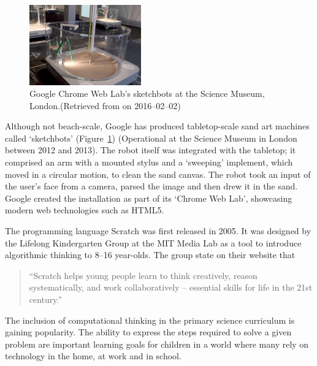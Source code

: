         \begin{figure}
          \begin{center}
            \includegraphics[width=0.43\textwidth]{Files/sketchbots}
          \end{center}
          \caption{Google Chrome Web Lab's sketchbots at the Science Museum, London.{\small (Retrieved from  on 2016--02--02)}}
          \label{fig: sketchbots}
        \end{figure}
        Although not beach-scale, Google has produced tabletop-scale sand art machines called `sketchbots' (Figure~\ref{fig: sketchbots}) (Operational at the Science Museum in London between 2012 and 2013).\cite{Warman2012} The robot itself was integrated with the tabletop; it comprised an arm with a mounted stylus and a `sweeping' implement, which moved in a circular motion, to clean the sand canvas. The robot took an input of the user's face from a camera, parsed the image and then drew it in the sand. Google  created the installation as part of its `Chrome Web Lab', showcasing modern web technologies such as HTML5.

\label{education review}
    The programming language Scratch was first released in 2005. It was designed by the Lifelong Kindergarten Group at the MIT Media Lab as a tool to introduce algorithmic thinking to 8--16 year-olds.\cite{scratch} The group state on their website that
    \begin{quotation}
        ``Scratch helps young people learn to think creatively, reason systematically, and work collaboratively -- essential skills for life in the 21st century.''
    \end{quotation}
    The inclusion of computational thinking in the primary science curriculum is gaining popularity. The ability to express the steps required to solve a given problem are important learning goals for children in a world where many rely on technology in the home, at work and in school.

